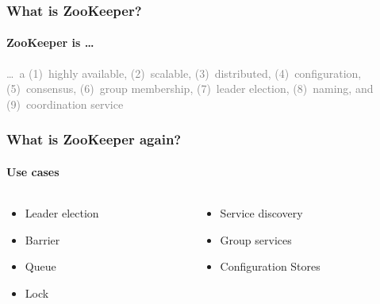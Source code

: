 \begin{frame}
	\frametitle{What is ZooKeeper?}
	\framesubtitle{ZooKeeper is \ldots}
	\textcolor<2>{gray}{\ldots~a (1)~highly available, (2)~scalable,
		(3)~\textcolor<2>{accent}{distributed}, (4)~\textcolor<2>{accent}{configuration},
		(5)~consensus, (6)~group membership, (7)~leader election, (8)~naming, and
		(9)~coordination \textcolor<2>{accent}{service}}
\end{frame}

\begin{frame}
	\frametitle{What is ZooKeeper again?}
	\framesubtitle{Use cases}
	\centering
	\begin{tcolorbox}[colback=accent!5!white,colframe=accent!75!black,width=.7\linewidth, title=Solve various coordination problems in large distributed system]
		\begin{columns}[c]
			\begin{column}{0.45\textwidth}
				\begin{itemize}
					\item Leader election
					\item Barrier
					\item Queue
					\item Lock
				\end{itemize}
			\end{column}
			\begin{column}{0.45\textwidth}
				\begin{itemize}
					\item Service discovery
					\item Group services
					\item<2> Configuration Stores
				\end{itemize}
			\end{column}
		\end{columns}
	\end{tcolorbox}
\end{frame}

